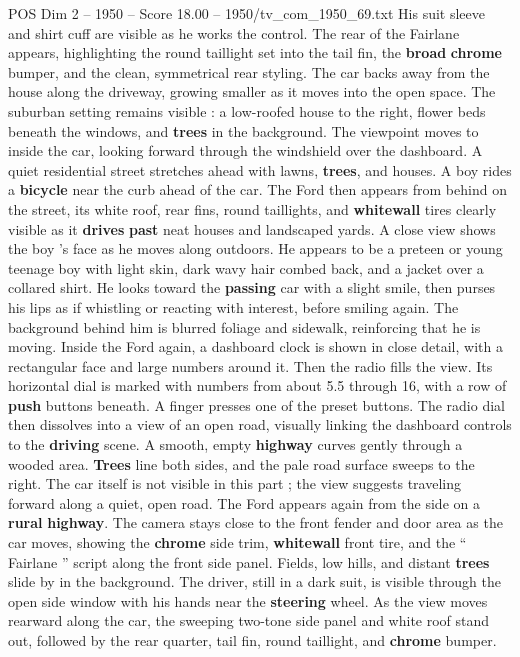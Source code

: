 \begin{textsample}{POS Dim 2 – 1950 – Score 18.00 – 1950/tv\_com\_1950\_69.txt}
His suit sleeve and shirt cuff are visible as he works the control.
The rear of the Fairlane appears, highlighting the round taillight set into the tail fin, the \textbf{broad} \textbf{chrome} bumper, and the clean, symmetrical rear styling.
The car backs away from the house along the driveway, growing smaller as it moves into the open space.
The suburban setting remains visible : a low-roofed house to the right, flower beds beneath the windows, and \textbf{trees} in the background.
The viewpoint moves to inside the car, looking forward through the windshield over the dashboard.
A quiet residential street stretches ahead with lawns, \textbf{trees}, and houses.
A boy rides a \textbf{bicycle} near the curb ahead of the car.
The Ford then appears from behind on the street, its white roof, rear fins, round taillights, and \textbf{whitewall} tires clearly visible as it \textbf{drives} \textbf{past} neat houses and landscaped yards.
A close view shows the boy ’s face as he moves along outdoors.
He appears to be a preteen or young teenage boy with light skin, dark wavy hair combed back, and a jacket over a collared shirt.
He looks toward the \textbf{passing} car with a slight smile, then purses his lips as if whistling or reacting with interest, before smiling again.
The background behind him is blurred foliage and sidewalk, reinforcing that he is moving.
Inside the Ford again, a dashboard clock is shown in close detail, with a rectangular face and large numbers around it.
Then the radio fills the view.
Its horizontal dial is marked with numbers from about 5.5 through 16, with a row of \textbf{push} buttons beneath.
A finger presses one of the preset buttons.
The radio dial then dissolves into a view of an open road, visually linking the dashboard controls to the \textbf{driving} scene.
A smooth, empty \textbf{highway} curves gently through a wooded area. \textbf{Trees} line both sides, and the pale road surface sweeps to the right.
The car itself is not visible in this part ; the view suggests traveling forward along a quiet, open road.
The Ford appears again from the side on a \textbf{rural} \textbf{highway}.
The camera stays close to the front fender and door area as the car moves, showing the \textbf{chrome} side trim, \textbf{whitewall} front tire, and the “ Fairlane ” script along the front side panel.
Fields, low hills, and distant \textbf{trees} slide by in the background.
The driver, still in a dark suit, is visible through the open side window with his hands near the \textbf{steering} wheel.
As the view moves rearward along the car, the sweeping two-tone side panel and white roof stand out, followed by the rear quarter, tail fin, round taillight, and \textbf{chrome} bumper.

\end{textsample}
